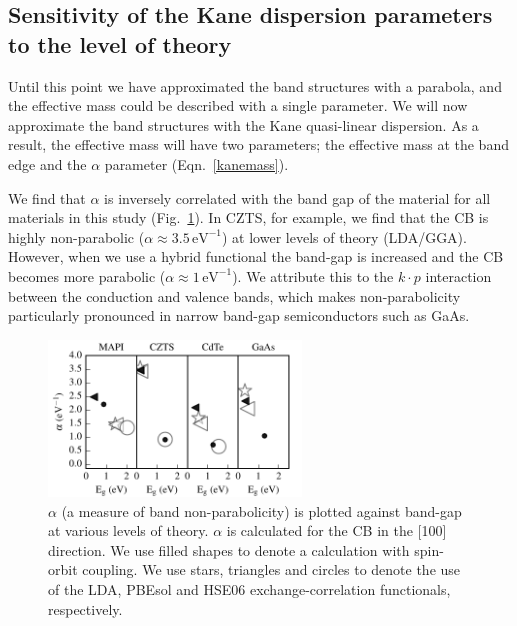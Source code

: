\subsection{Sensitivity of the Kane dispersion parameters to the level of theory}

Until this point we have approximated the band structures with a parabola, and the effective mass could be described with a single parameter.
We will now approximate the band structures with the Kane quasi-linear dispersion. As a result, the effective mass will have two parameters; the effective mass at the band edge and the $\alpha$ parameter (Eqn.\ \ref{kanemass}).

We find that $\alpha$ is inversely correlated with the band gap of the material for all materials in this study (Fig.\ \ref{alpha_bandgap_plot}). 
In CZTS, for example, we find that the CB is highly non-parabolic ($\alpha\approx3.5\,\textrm{eV}^{-1}$) at lower levels of theory (LDA/GGA).
However, when we use a hybrid functional the band-gap is increased and the CB becomes more parabolic ($\alpha\approx1\,\textrm{eV}^{-1}$).
We attribute this to the $k\cdot p$ interaction between the conduction and valence bands,\autocite{Kane1957} which makes non-parabolicity particularly pronounced in narrow band-gap semiconductors such as GaAs.\autocite{Szmyd1990}

\begin{figure}[tb] \centering
\includegraphics[width=0.6\textwidth]{./figures/ch4/alpha_bandgap_plot.pdf}
\caption[Band non-parabolicity and band-gap]{\label{alpha_bandgap_plot}$\alpha$ (a measure of band non-parabolicity) is plotted against band-gap at various levels of theory. $\alpha$ is calculated for the CB in the [100] direction. We use filled shapes to denote a calculation with spin-orbit coupling. We use stars, triangles and circles to denote the use of the LDA, PBEsol and HSE06 exchange-correlation functionals, respectively. }
\end{figure}

